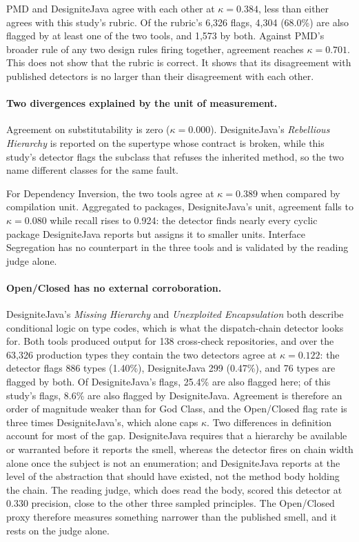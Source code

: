 PMD and DesigniteJava agree with each other at $\kappa = 0.384$, less than either agrees with this
study's rubric. Of the rubric's 6{,}326 flags, 4{,}304 (68.0\%) are also flagged by at least one of
the two tools, and 1{,}573 by both. Against PMD's broader rule of any two design rules firing
together, agreement reaches $\kappa = 0.701$. This does not show that the rubric is correct. It
shows that its disagreement with published detectors is no larger than their disagreement with each
other.

\paragraph{Two divergences explained by the unit of measurement.} Agreement on substitutability is
zero ($\kappa = 0.000$). DesigniteJava's \emph{Rebellious Hierarchy} is reported on the supertype
whose contract is broken, while this study's detector flags the subclass that refuses the inherited
method, so the two name different classes for the same fault.

For Dependency Inversion, the two tools agree at $\kappa = 0.389$ when compared by compilation unit.
Aggregated to packages, DesigniteJava's unit, agreement falls to $\kappa = 0.080$ while recall rises
to 0.924: the detector finds nearly every cyclic package DesigniteJava reports but assigns it to
smaller units. Interface Segregation has no counterpart in the three tools and is validated by the
reading judge alone.

\paragraph{Open/Closed has no external corroboration.} DesigniteJava's \emph{Missing Hierarchy} and
\emph{Unexploited Encapsulation} both describe conditional logic on type codes, which is what the
dispatch-chain detector looks for. Both tools produced output for
138 cross-check repositories, and over the 63{,}326 production types they contain the two detectors
agree at $\kappa = 0.122$: the detector
flags 886 types (1.40\%), DesigniteJava 299 (0.47\%), and 76 types are flagged by both. Of
DesigniteJava's flags, 25.4\% are also flagged here; of this study's flags, 8.6\% are also flagged by
DesigniteJava. Agreement is therefore an order of magnitude weaker than for God Class, and the
Open/Closed flag rate is three times DesigniteJava's, which alone caps $\kappa$. Two differences in
definition account for most of the gap. DesigniteJava requires that a hierarchy be available or
warranted before it reports the smell, whereas the detector fires on chain width alone once the
subject is not an enumeration; and DesigniteJava reports at the level of the abstraction that should
have existed, not the method body holding the chain. The reading judge, which does read the body,
scored this detector at 0.330 precision, close to the other three sampled principles. The Open/Closed
proxy therefore measures something narrower than the published smell, and it rests on the judge
alone.

